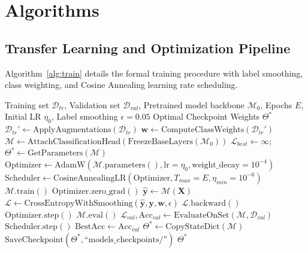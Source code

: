\documentclass[conference]{IEEEtran}
\begin{document}
\section{Algorithms}

\subsection{Transfer Learning and Optimization Pipeline}
Algorithm~\ref{alg:train} details the formal training procedure with label smoothing, class weighting, and Cosine Annealing learning rate scheduling.

\begin{algorithm}[htbp]
\caption{Transfer Learning \& Optimization Pipeline}
\label{alg:train}
\begin{algorithmic}[1]
\REQUIRE Training set $\mathcal{D}_{tr}$, Validation set $\mathcal{D}_{val}$, Pretrained model backbone $\mathcal{M}_0$, Epochs $E$, Initial LR $\eta_0$, Label smoothing $\epsilon=0.05$
\ENSURE Optimal Checkpoint Weights $\Theta^{*}$
\STATE $\mathcal{D}_{tr}' \leftarrow \text{ApplyAugmentations}(\mathcal{D}_{tr})$
\STATE $\mathbf{w} \leftarrow \text{ComputeClassWeights}(\mathcal{D}_{tr}')$ 
\STATE $\mathcal{M} \leftarrow \text{AttachClassificationHead}(\text{FreezeBaseLayers}(\mathcal{M}_0))$
\STATE $\mathcal{L}_{best} \leftarrow \infty$; $\Theta^{*} \leftarrow \text{GetParameters}(\mathcal{M})$
\STATE $\text{Optimizer} \leftarrow \text{AdamW}(\mathcal{M}.\text{parameters}(), \text{lr}=\eta_0, \text{weight\_decay}=10^{-4})$
\STATE $\text{Scheduler} \leftarrow \text{CosineAnnealingLR}(\text{Optimizer}, T_{max}=E, \eta_{min}=10^{-6})$
    \STATE $\mathcal{M}.\text{train}()$
        \STATE $\text{Optimizer}.\text{zero\_grad}()$
        \STATE $\hat{\mathbf{y}} \leftarrow \mathcal{M}(\mathbf{X})$
        \STATE $\mathcal{L} \leftarrow \text{CrossEntropyWithSmoothing}(\hat{\mathbf{y}}, \mathbf{y}, \mathbf{w}, \epsilon)$
        \STATE $\mathcal{L}.\text{backward}()$
        \STATE $\text{Optimizer}.\text{step}()$
    \ENDFOR
    \STATE $\mathcal{M}.\text{eval}()$
    \STATE $\mathcal{L}_{val}, \text{Acc}_{val} \leftarrow \text{EvaluateOnSet}(\mathcal{M}, \mathcal{D}_{val})$
    \STATE $\text{Scheduler}.\text{step}()$
        \STATE $\text{BestAcc} \leftarrow \text{Acc}_{val}$
        \STATE $\Theta^{*} \leftarrow \text{CopyStateDict}(\mathcal{M})$
        \STATE $\text{SaveCheckpoint}(\Theta^{*}, \text{``models\_checkpoints/''})$
    \ENDIF
\ENDFOR
\RETURN $\Theta^{*}$
\end{algorithmic}
\end{algorithm}
\end{document}
